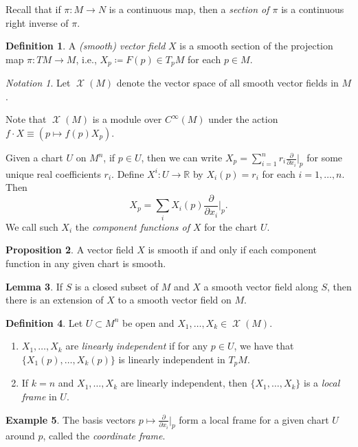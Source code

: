 \documentclass[10pt,letterpaper,cm]{nupset}
\theoremstyle{definition}
\newtheorem{definition}{Definition}[subsection]
\newtheorem{exmp}[definition]{Example}
\theoremstyle{theorem}
\newtheorem{lemma}[definition]{Lemma}
\newtheorem{prop}[definition]{Proposition}
\theoremstyle{remark}
\newtheorem*{notation}{Notation}
\newcommand{\R}{\mathbb R}
\newcommand{\1}{\mathbf{1}}
\newcommand{\0}{\vec 0}
\DeclareMathOperator{\vf}{\mathscr{X}}
\begin{document}
Recall that if $\pi : M \to N$ is a continuous map, then a \textit{section of $\pi$} is a continuous right inverse of $\pi$.


\begin{definition}
A \textit{(smooth) vector field} $X$ is a smooth section of the projection map $\pi : TM \to M$, i.e., $X_p\coloneqq  F(p) \in T_pM$ for each $p \in M$. 
\end{definition}


\begin{notation}
Let $\vf(M)$ denote the vector space of all smooth vector fields in $M$.
\end{notation}
Note that $\vf(M)$ is a module over $C^{\infty}(M)$ under the action $f \cdot X \equiv \left(p \mapsto f(p)X_p\right)$.

\medskip


Given a chart $U$ on $M^n$, if $p\in U$, then we can write $X_p = \sum_{i=1}^n r_i \frac{\partial}{\partial x_i}\bigr\rvert_p$ for some unique real coefficients $r_i$. Define $X^i : U \to \R$ by $X_i(p) = r_i$ for each $i=1, \ldots, n$. Then $$X_p = \sum_i X_i(p) \frac{\partial}{\partial x_i}\bigr\rvert_p.$$
We call such $X_i$ the \textit{component functions of $X$} for the chart $U$.


\begin{prop}
A vector field $X$ is smooth if and only if each component function in any given chart is smooth.
\end{prop}


\begin{lemma}
If $S$ is a closed subset of $M$ and $X$ a smooth vector field along $S$, then there is an extension of $X$ to a smooth vector field on $M$.
\end{lemma}

\begin{definition} Let $U \subset M^n$ be open and $X_1, \ldots, X_k \in \vf(M)$. 
\begin{enumerate}
\item  $X_1, \ldots, X_k$ are \textit{linearly independent} if for any $p\in U$, we have that $\{X_1(p), \ldots, X_k(p)\}$ is linearly independent in $T_pM$.
\item If $k=n$ and $X_1, \ldots, X_k$ are linearly independent, then $\{X_1, \ldots, X_k\}$ is a \textit{local frame} in $U$.
\end{enumerate}
\end{definition}

\begin{exmp}
The basis vectors $p\mapsto \frac{\partial}{\partial{x_i}}\bigr\rvert_p$ form a local frame for a given chart $U$ around $p$, called the \textit{coordinate frame}.
\end{exmp}
\end{document}
